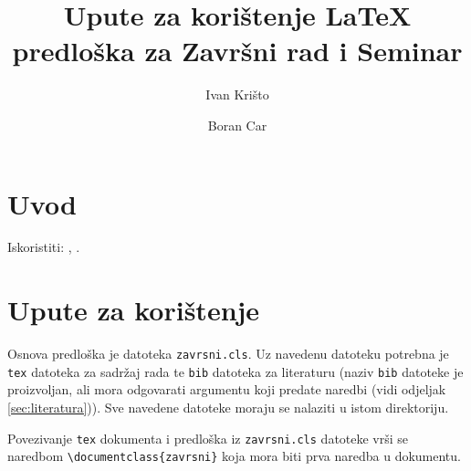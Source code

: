 \documentclass{zavrsni}
\begin{document}
\title{Upute za korištenje \LaTeX{} predloška za Završni rad i Seminar}
\author{Ivan Krišto \and Boran Car}

\maketitle

\tableofcontents

\chapter{Uvod}


Iskoristiti: \citep{taraborelli2009beauty}, \citep{cottrell1999word}.

\chapter{Upute za korištenje}
\label{ch:upute}
Osnova predloška je datoteka \texttt{zavrsni.cls}. Uz navedenu datoteku potrebna
je \texttt{tex} datoteka za sadržaj rada te \texttt{bib} datoteka za literaturu
(naziv \texttt{bib} datoteke je proizvoljan, ali mora odgovarati argumentu koji
predate naredbi \verb|| (vidi odjeljak \ref{sec:literatura})). Sve
navedene datoteke moraju se nalaziti u istom direktoriju.

Povezivanje \texttt{tex} dokumenta i predloška iz \texttt{zavrsni.cls}
datoteke vrši se naredbom \verb|\documentclass{zavrsni}| koja mora biti prva
naredba u dokumentu.
\end{document}
